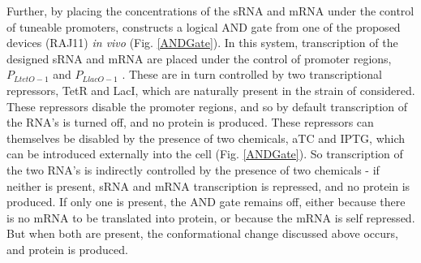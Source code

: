 \documentclass[10pt,journal]{./IEEE_latex_class/IEEEtran}
\begin{document}
Further, by placing the concentrations of the sRNA and mRNA under the control of tuneable promoters, \cite{Rodrigo2012} constructs a logical AND gate from one of the proposed devices (RAJ11) \textit{in vivo} (Fig. \ref{ANDGate}). In this system, transcription of the designed sRNA and mRNA are placed under the control of promoter regions, $P_{LtetO-1}$ and $P_{LlacO-1}$ \cite{Lutz1997}. These are in turn controlled by two transcriptional repressors, TetR and LacI, which are naturally present in the strain of  considered. These repressors disable the promoter regions, and so by default transcription of the RNA's is turned off, and no protein is produced. 
These repressors can themselves be disabled by the presence of two chemicals, aTC and IPTG, which can be introduced externally into the cell (Fig. \ref{ANDGate}).  So transcription of the two RNA's is indirectly controlled by the presence of two chemicals - if neither is present, sRNA and mRNA transcription is repressed, and no protein is produced. If only one is present, the AND gate remains off, either because there is no mRNA to be translated into protein, or because the mRNA is self repressed. But when both are present, the conformational change discussed above occurs, and protein is produced.
\end{document}
